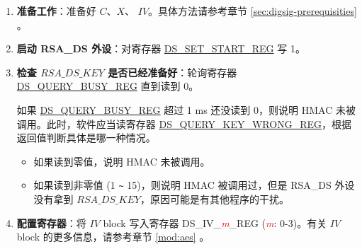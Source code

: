 \documentclass[main\_\_CN.tex]{subfiles}
\begin{document}
\begin{enumerate}

    \item {\bfseries 准备工作}：准备好 \begin{math}C\end{math}、\begin{math}X\end{math}、 \begin{math}IV\end{math}。具体方法请参考章节 \ref{sec:digsig-prerequisities} 。

    \item {\bfseries 启动 RSA\_DS 外设}：对寄存器 \hyperref[regdesc:DSSETSTARTREG]{DS\_SET\_START\_REG} 写 1。

    \item {\bfseries 检查 \begin{math}RSA\_DS\_KEY\end{math} 是否已经准备好}：轮询寄存器 \hyperref[regdesc:DSQUERYBUSYREG]{DS\_QUERY\_BUSY\_REG} 直到读到 0。

    如果 \hyperref[regdesc:DSQUERYBUSYREG]{DS\_QUERY\_BUSY\_REG} 超过 1 ms 还没读到 0，则说明 HMAC 未被调用。此时，软件应当读寄存器 \hyperref[regdesc:DSQUERYKEYWRONGREG]{DS\_QUERY\_KEY\_WRONG\_REG}，根据返回值判断具体是哪一种情况。
    \begin{itemize}

        \item 如果读到零值，说明 HMAC 未被调用。

        \item 如果读到非零值 (1 \verb+~+ 15)，则说明 HMAC 被调用过，但是 RSA\_DS 外设没有拿到 \begin{math}RSA\_DS\_KEY\end{math}，原因可能是有其他程序的干扰。

    \end{itemize}

    \item {\bfseries 配置寄存器}：将 \begin{math}IV\end{math} block 写入寄存器 DS\_IV\_\textcolor{red}{\it{m}}\_REG (\textcolor{red}{\it{m}}: 0-3)。有关 \begin{math}IV\end{math} block 的更多信息，请参考章节 \ref{mod:aes} \textit{}。


\end{enumerate}
\end{document}
